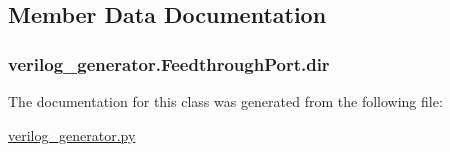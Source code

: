 \subsection{Member Data Documentation}
\hypertarget{classverilog__generator_1_1FeedthroughPort_acbb2b180844c87406724b2cf8f26de8d}{
\subsubsection[{dir}]{\setlength{\rightskip}{0pt plus 5cm}verilog\-\_\-generator.\-Feedthrough\-Port.\-dir}}\label{classverilog__generator_1_1FeedthroughPort_acbb2b180844c87406724b2cf8f26de8d}


The documentation for this class was generated from the following file\-:\begin{DoxyCompactItemize}
\item 
\hyperlink{verilog__generator_8py}{verilog\-\_\-generator.\-py}\end{DoxyCompactItemize}
